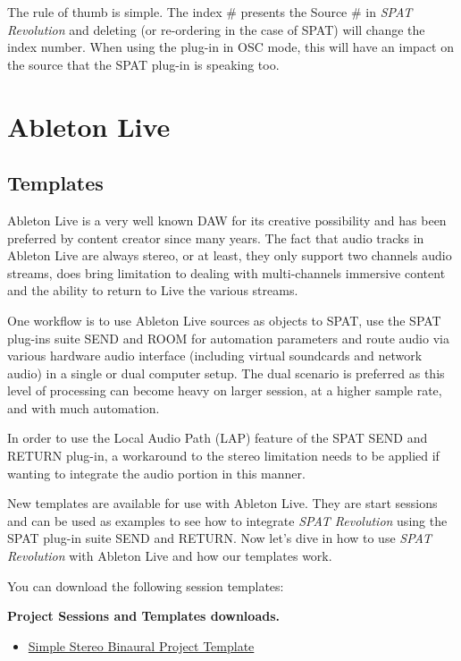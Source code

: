 \documentclass[
  letterpaper,
  DIV=11,
  numbers=noendperiod]{scrreport}
\providecommand{\tightlist}{%
  \setlength{\itemsep}{0pt}\setlength{\parskip}{0pt}}\usepackage{longtable,booktabs,array}
\begin{document}
The rule of thumb is simple. The index \# presents the Source \# in
\emph{SPAT Revolution} and deleting (or re-ordering in the case of SPAT)
will change the index number. When using the plug-in in OSC mode, this
will have an impact on the source that the SPAT plug-in is speaking too.

\hypertarget{ableton-live}{%
\chapter{Ableton Live}\label{ableton-live}}

\hypertarget{templates-2}{%
\section{Templates}\label{templates-2}}

Ableton Live is a very well known DAW for its creative possibility and
has been preferred by content creator since many years. The fact that
audio tracks in Ableton Live are always stereo, or at least, they only
support two channels audio streams, does bring limitation to dealing
with multi-channels immersive content and the ability to return to Live
the various streams.

One workflow is to use Ableton Live sources as objects to SPAT, use the
SPAT plug-ins suite SEND and ROOM for automation parameters and route
audio via various hardware audio interface (including virtual soundcards
and network audio) in a single or dual computer setup. The dual scenario
is preferred as this level of processing can become heavy on larger
session, at a higher sample rate, and with much automation.

In order to use the Local Audio Path (LAP) feature of the SPAT SEND and
RETURN plug-in, a workaround to the stereo limitation needs to be
applied if wanting to integrate the audio portion in this manner.

New templates are available for use with Ableton Live. They are start
sessions and can be used as examples to see how to integrate \emph{SPAT
Revolution} using the SPAT plug-in suite SEND and RETURN. Now let's dive
in how to use \emph{SPAT Revolution} with Ableton Live and how our
templates work.

You can download the following session templates:

\textbf{Project Sessions and Templates downloads.}

\begin{itemize}
\tightlist
\item
  \href{https://public.3.basecamp.com/p/EidSWQKQTQTqGTsKYrxuPjoW}{Simple
  Stereo Binaural Project Template}
\end{itemize}
\end{document}
